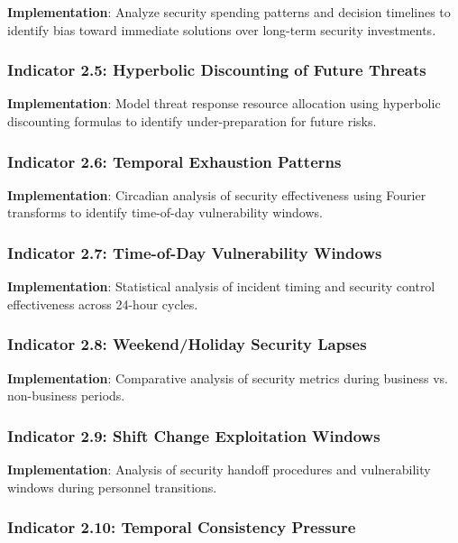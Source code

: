 \documentclass[11pt, onecolumn]{article}
\begin{document}
\textbf{Implementation}: Analyze security spending patterns and decision timelines to identify bias toward immediate solutions over long-term security investments.

\subsubsection{Indicator 2.5: Hyperbolic Discounting of Future Threats}

\textbf{Implementation}: Model threat response resource allocation using hyperbolic discounting formulas to identify under-preparation for future risks.

\subsubsection{Indicator 2.6: Temporal Exhaustion Patterns}

\textbf{Implementation}: Circadian analysis of security effectiveness using Fourier transforms to identify time-of-day vulnerability windows.

\subsubsection{Indicator 2.7: Time-of-Day Vulnerability Windows}

\textbf{Implementation}: Statistical analysis of incident timing and security control effectiveness across 24-hour cycles.

\subsubsection{Indicator 2.8: Weekend/Holiday Security Lapses}

\textbf{Implementation}: Comparative analysis of security metrics during business vs. non-business periods.

\subsubsection{Indicator 2.9: Shift Change Exploitation Windows}

\textbf{Implementation}: Analysis of security handoff procedures and vulnerability windows during personnel transitions.

\subsubsection{Indicator 2.10: Temporal Consistency Pressure}
\end{document}
